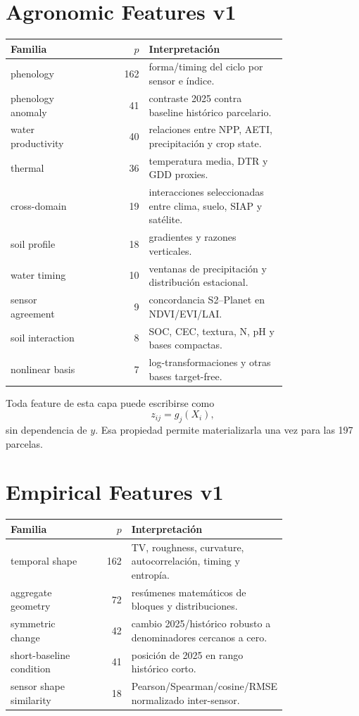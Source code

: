 \section{Agronomic Features v1}

\begin{longtable}{p{0.28\linewidth}rp{0.50\linewidth}}
\toprule
Familia & $p$ & Interpretación \\
\midrule
\endhead
phenology & 162 & forma/timing del ciclo por sensor e índice.\\
phenology anomaly & 41 & contraste 2025 contra baseline histórico parcelario.\\
water productivity & 40 & relaciones entre NPP, AETI, precipitación y crop state.\\
thermal & 36 & temperatura media, DTR y GDD proxies.\\
cross-domain & 19 & interacciones seleccionadas entre clima, suelo, SIAP y satélite.\\
soil profile & 18 & gradientes y razones verticales.\\
water timing & 10 & ventanas de precipitación y distribución estacional.\\
sensor agreement & 9 & concordancia S2--Planet en NDVI/EVI/LAI.\\
soil interaction & 8 & SOC, CEC, textura, N, pH y bases compactas.\\
nonlinear basis & 7 & log-transformaciones y otras bases target-free.\\
\bottomrule
\end{longtable}

Toda feature de esta capa puede escribirse como
\[
z_{ij}=g_j(X_i),
\]
sin dependencia de $y$. Esa propiedad permite materializarla una vez para las 197 parcelas.

\section{Empirical Features v1}

\begin{longtable}{p{0.31\linewidth}rp{0.47\linewidth}}
\toprule
Familia & $p$ & Interpretación \\
\midrule
\endhead
temporal shape & 162 & TV, roughness, curvature, autocorrelación, timing y entropía.\\
aggregate geometry & 72 & resúmenes matemáticos de bloques y distribuciones.\\
symmetric change & 42 & cambio 2025/histórico robusto a denominadores cercanos a cero.\\
short-baseline condition & 41 & posición de 2025 en rango histórico corto.\\
sensor shape similarity & 18 & Pearson/Spearman/cosine/RMSE normalizado inter-sensor.\\
\bottomrule
\end{longtable}

